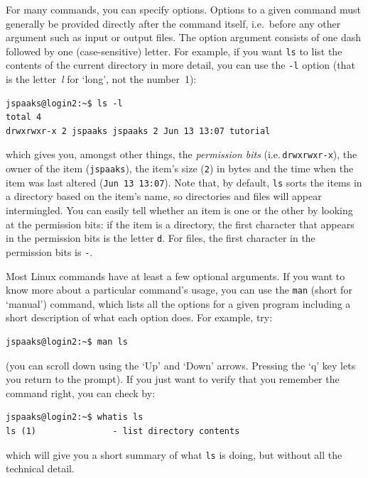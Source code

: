 For many commands, you can specify options. Options to a given command must generally be provided directly after the command itself, i.e.~before any other argument such as input or output files.  The option argument consists of one dash followed by one (case-sensitive) letter. For example, if you want \texttt{ls} to list the contents of the current directory in more detail, you can use the \texttt{-l} option (that is the letter~\textit{l} for `long', not the number~1):
\begin{lstlisting}[style=basic,style=bash]
jspaaks@login2:~$ ls -l
total 4
drwxrwxr-x 2 jspaaks jspaaks 2 Jun 13 13:07 tutorial
\end{lstlisting}
which gives you, amongst other things, the \textit{permission bits} (i.e.\,\lstinline{drwxrwxr-x}), the owner of the item (\lstinline{jspaaks}), the item's size (\lstinline{2}) in bytes and the time when the item was last altered (\lstinline{Jun 13 13:07}). Note that, by default, \lstinline[style=bashinline]{ls} sorts the items in a directory based on the item's name, so directories and files will appear intermingled. You can easily tell whether an item is one or the other by looking at the permission bits: if the item is a directory, the first character that appears in the permission bits is the letter \lstinline[style=bashinline]{d}. For files, the first character in the permission bits is \lstinline[style=bashinline]{-}.

Most Linux commands have at least a few optional arguments. If you want to know more about a particular command's usage, you can use the \texttt{man} (short for `manual') command, which lists all the options for a given program including a short description of what each option does. For example, try:
\begin{lstlisting}[style=basic,style=bash]
jspaaks@login2:~$ man ls
\end{lstlisting}
(you can scroll down using the `Up' and `Down' arrows. Pressing the `q' key lets you return to the prompt). If you just want to verify that you remember the command right, you can check by:
\begin{lstlisting}[style=basic,style=bash]
jspaaks@login2:~$ whatis ls
ls (1)               - list directory contents
\end{lstlisting}
which will give you a short summary of what \lstinline{ls} is doing, but without all the technical detail.

